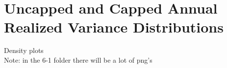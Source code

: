 
\graphicspath{{6 Results/6-1 Realized Variance Distributions}}

\section{Uncapped and Capped Annual Realized Variance Distributions}

Density plots\\
Note: in the 6-1 folder there will be a lot of png's
